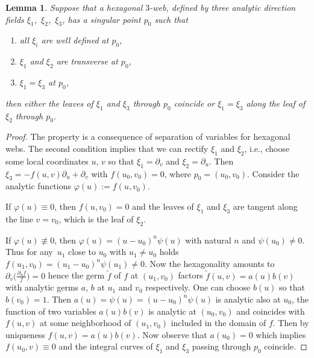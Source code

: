 \documentclass[pdftex]{sigma}
\numberwithin{equation}{section}
\newtheorem{Lemma}[Theorem]{Lemma}
\begin{document}
\begin{Lemma}\label{sing}
Suppose that a hexagonal $3$-web, defined by three analytic direction fields $\xi_1$,~$\xi_2$,~$\xi_3$, has a singular point $p_0$ such that
\begin{enumerate}\itemsep=0pt
\item[$(1)$] all $\xi_i$ are well defined at $p_0$,
\item[$(2)$] $\xi_1$ and $\xi_2$ are transverse at $p_0$,
\item[$(3)$] $\xi_1=\xi_3$ at $p_0$,
\end{enumerate}
then either the leaves of $\xi_1$ and $\xi_3$ through $p_0$ coincide or
$\xi_1=\xi_3$ along the leaf of $\xi_2$ through $p_0$.
\end{Lemma}
\begin{proof}
The property is a consequence of separation of variables for hexagonal webs.
The second condition implies that we can rectify $\xi_1$ and $\xi_2$, i.e., choose some local coordinates $u$, $v$ so that $\xi_1=\partial_v$ and $\xi_2=\partial_u$. Then $\xi_3=-f(u,v)\partial_u+\partial_v$ with $f(u_0,v_0)=0$, where $p_0=(u_0,v_0).$
Consider the analytic functions $\varphi(u):=f(u,v_0)$.

If $\varphi(u)\equiv 0$, then $f(u,v_0)=0$ and the leaves of $\xi_1$ and $\xi_3$ are tangent along the line $v=v_0$, which is the leaf of $\xi_2$.

 If $\varphi(u)\not\equiv 0$, then $\varphi(u)=(u-u_0)^n\psi(u)$ with natural $n$ and $\psi(u_0)\ne 0$. Thus for any~$u_1$ close to $u_0$ with $u_1\ne u_0$ holds $f(u_1,v_0)=(u_1-u_0)^n\psi(u_1)\ne 0$. Now the hexagonality amounts to~${\partial_v\bigl(\frac{\partial_uf}{f}\bigr)=0}$ hence the germ $\tilde{f}$ of $f$ at $(u_1,v_0)$ factors $\tilde{f}(u,v)=a(u)b(v)$ with analytic germs $a$, $b$ at $u_1$ and $v_0$ respectively. One can choose $b(u)$ so that $b(v_0)=1$. Then $a(u)=\psi(u)=(u-u_0)^n\psi(u)$ is analytic also at $u_0$, the function of two variables $a(u)b(v)$ is analytic at $(u_0,v_0)$ and coincides with $f(u,v)$ at some neighborhood of $(u_1,v_0)$ included in the domain of $f$. Then by uniqueness $f(u,v)=a(u)b(v)$. Now observe that $a(u_0)=0$ which
implies $f(u_0,v)\equiv 0$ and the integral curves of $\xi_1$ and $\xi_3$ passing through $p_0$ coincide.
\end{proof}
\end{document}

